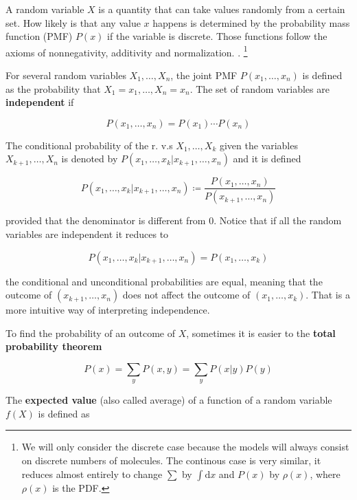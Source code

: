 A random variable $X$ is a quantity that can take values randomly from a certain set. How likely is that any value $x$ happens is determined by the probability mass function (PMF) $P(x)$ if the variable is discrete. Those functions follow the  axioms of nonnegativity, additivity and normalization. \cite{bertsekas08}. \footnote{We will only consider the discrete case because the models will always consist on discrete numbers of molecules. The continous case is very similar, it reduces almost entirely to change $\sum$ by $\int\mathrm{d}x$ and $P(x)$ by $\rho(x)$, where $\rho(x)$ is the PDF.}

For several random variables $X_1,\dotsc,X_n$, the joint PMF  $P(x_1,\dotsc,x_n)$ is defined as the probability that $X_1=x_1,\dotsc,X_n=x_n$. The set of random variables are \textbf{independent} if

\begin{equation}
  P(x_1,\dotsc,x_n) = P(x_1)\dotsm P(x_n)
\end{equation}

The conditional probability of the r. v.s $X_1,\dotsc,X_k$ given the variables $X_{k+1},\dotsc,X_n$ is denoted by $P(x_1,\dotsc,x_k|x_{k+1},\dotsc,x_n)$ and it is defined

\begin{equation}
  P(x_1,\dotsc,x_k|x_{k+1},\dotsc,x_n) \coloneqq \frac{P(x_1,\dotsc,x_n)}{P(x_{k+1},\dotsc,x_n)}
\end{equation}

provided that the denominator is different from $0$. Notice that if all the random variables are independent it reduces to

\begin{equation}
  P(x_1,\dotsc,x_k|x_{k+1},\dotsc,x_n) = P(x_1,\dotsc,x_k)
\end{equation}

the conditional and unconditional probabilities are equal, meaning that the outcome of $(x_{k+1},\dotsc,x_n)$ does not affect the outcome of $(x_1,\dotsc,x_k)$. That is a more intuitive way of interpreting independence.

To find the probability of an outcome of $X$, sometimes it is easier to the \textbf{total probability theorem}

\begin{equation}
  P(x) = \sum_y P(x,y) = \sum_y P(x|y)P(y)
\end{equation}

The \textbf{expected value} (also called average) of a function of a random variable $f(X)$ is defined as

